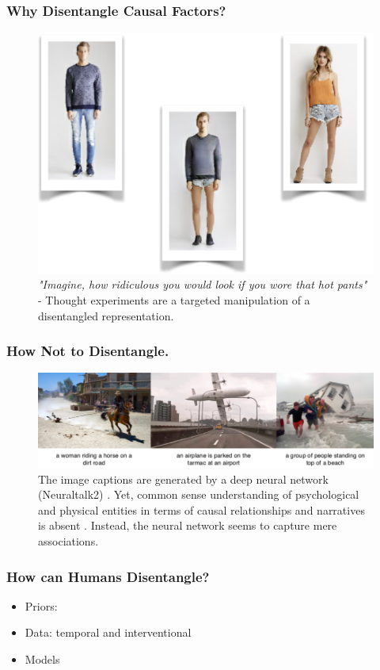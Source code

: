 \begin{frame}[plain]
\titlepage
\end{frame}



\begin{frame}
\frametitle{Why Disentangle Causal Factors?}
	\begin{figure}[htp]
		\centering
		\includegraphics[trim={0cm 0cm 0cm 0cm},clip, width=0.4\linewidth]{fig/other/hotpants}
		\caption{\textit{"Imagine, how ridiculous you would look if you wore that hot pants"} - Thought experiments are a targeted manipulation of a disentangled representation.}
		\label{fig:hotpants}
	\end{figure}
\end{frame}

\begin{frame}
\frametitle{How Not to Disentangle.}
	\begin{figure}[htp]
		\centering
		\includegraphics[trim={0cm 0cm 0cm 0cm},clip, width=1.\linewidth]{fig/other/notcausal}
		\caption{The image captions are generated by a deep neural network (Neuraltalk2) \cite{karpathy15neuraltalk}. Yet, common sense understanding of psychological and physical entities in terms of causal relationships and narratives is absent \cite{tenenbaum18think}. Instead, the neural network seems to capture mere associations.}
		\label{fig:notcausal}
	\end{figure}
\end{frame}

\begin{frame}
\frametitle{How can Humans Disentangle?}
	\begin{itemize}
		\item Priors:
		\item Data: temporal and interventional
		\item Models
	\end{itemize}
\end{frame}

